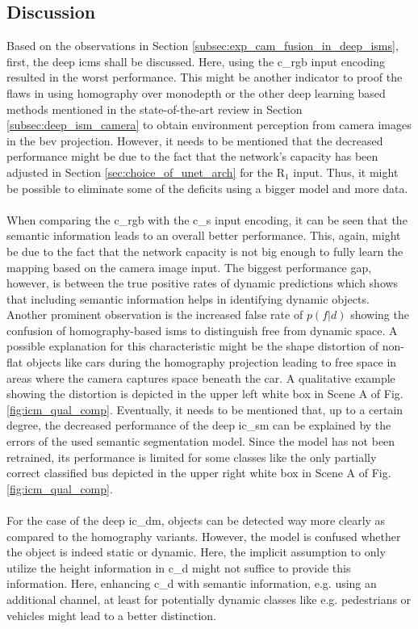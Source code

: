 \subsection{Discussion}
\label{subsec:discussion_deep_icm_ilm}
Based on the observations in Section \ref{subsec:exp_cam_fusion_in_deep_isms}, first, the deep \gls{icm}s shall be discussed. Here, using the \gls{c_rgb} input encoding resulted in the worst performance. This might be another indicator to proof the flaws in using homography over \gls{monodepth} or the other deep learning based methods mentioned in the state-of-the-art review in Section \ref{subsec:deep_ism_camera} to obtain environment perception from camera images in the \gls{bev} projection. However, it needs to be mentioned that the decreased performance might be due to the fact that the network's capacity has been adjusted in Section \ref{sec:choice_of_unet_arch} for the R$_1$ input. Thus, it might be possible to eliminate some of the deficits using a bigger model and more data.
\\\\
When comparing the \gls{c_rgb} with the \gls{c_s} input encoding, it can be seen that the semantic information leads to an overall better performance. This, again, might be due to the fact that the network capacity is not big enough to fully learn the mapping based on the camera image input. The biggest performance gap, however, is between the true positive rates of dynamic predictions which shows that including semantic information helps in identifying dynamic objects. Another prominent observation is the increased false rate of $p(f|d)$ showing the confusion of homography-based \gls{ism}s to distinguish free from dynamic space. A possible explanation for this characteristic might be the shape distortion of non-flat objects like cars during the homography projection leading to free space in areas where the camera captures space beneath the car. A qualitative example showing the distortion is depicted in the upper left white box in Scene A of Fig. \ref{fig:icm_qual_comp}. Eventually, it needs to be mentioned that, up to a certain degree, the decreased performance of the deep \gls{ic_sm} can be explained by the errors of the used semantic segmentation model. Since the model has not been retrained, its performance is limited for some classes like the only partially correct classified bus depicted in the upper right white box in Scene A of Fig. \ref{fig:icm_qual_comp}.
\\\\
For the case of the deep \gls{ic_dm}, objects can be detected way more clearly as compared to the homography variants. However, the model is confused whether the object is indeed static or dynamic. Here, the implicit assumption to only utilize the height information in \gls{c_d} might not suffice to provide this information. Here, enhancing \gls{c_d} with semantic information, e.g. using an additional channel, at least for potentially dynamic classes like e.g. pedestrians or vehicles might lead to a better distinction.
